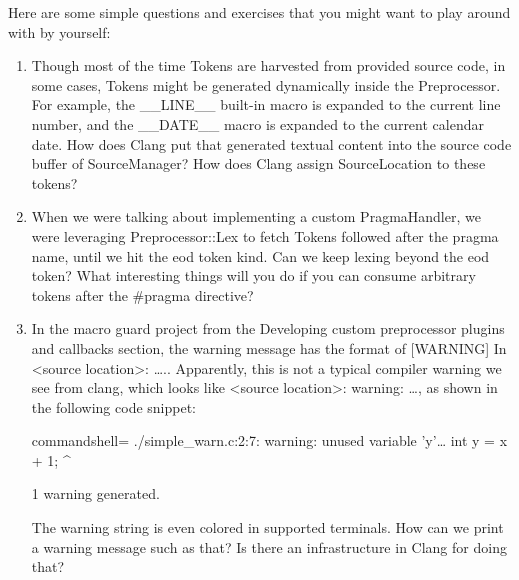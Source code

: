 
Here are some simple questions and exercises that you might want to play around with by yourself:

\begin{enumerate}
\item Though most of the time Tokens are harvested from provided source code, in some cases, Tokens might be generated dynamically inside the Preprocessor. For example, the \_\_LINE\_\_ built-in macro is expanded to the current line number, and the \_\_DATE\_\_ macro is expanded to the current calendar date. How does Clang put that generated textual content into the source code buffer of SourceManager? How does Clang assign SourceLocation to these tokens?

\item When we were talking about implementing a custom PragmaHandler, we were leveraging Preprocessor::Lex to fetch Tokens followed after the pragma name, until we hit the eod token kind. Can we keep lexing beyond the eod token? What interesting things will you do if you can consume arbitrary tokens after the \#pragma directive?

\item  In the macro guard project from the Developing custom preprocessor plugins and callbacks section, the warning message has the format of [WARNING] In <source location>: ….. Apparently, this is not a typical compiler warning we see from clang, which looks like <source location>: warning: …, as shown in the following code snippet:

\begin{tcblisting}{commandshell={}}
./simple_warn.c:2:7: warning: unused variable 'y'…
  int y = x + 1;
       ^

1 warning generated.
\end{tcblisting}

The warning string is even colored in supported terminals. How can we print a warning message such as that? Is there an infrastructure in Clang for doing that?

\end{enumerate}












